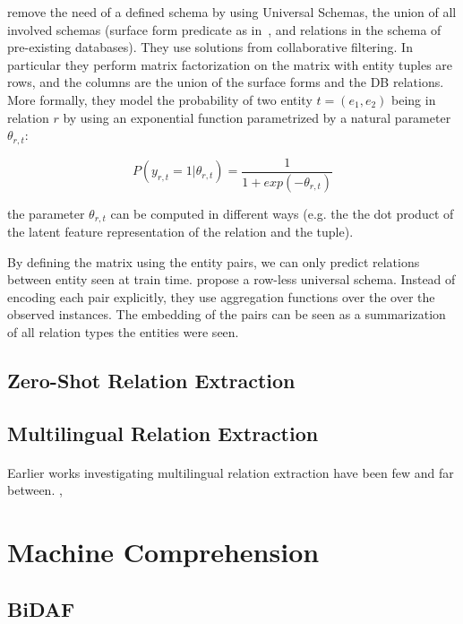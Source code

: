 \cite{riedel2013relation} remove the need of a defined schema by using Universal Schemas, the union of all involved schemas (surface form predicate as in~\citep{banko2007openre}, and relations in the schema of pre-existing databases). They use solutions from collaborative filtering. In particular they perform matrix factorization on the matrix with entity tuples are rows, and the columns are the union of the surface forms and the DB relations. More formally, they model the probability of two entity $t = (e_1, e_2)$ being in relation $r$ by using an exponential function parametrized by a natural parameter $\theta_{r, t}$:

\begin{equation}
    P(y_{r, t} = 1 | \theta_{r, t}) = \frac{1}{1+exp(-\theta_{r,t})}
\end{equation}

the parameter $\theta_{r,t}$ can be computed in different ways (e.g. the the dot product of the latent feature representation of the relation and the tuple).

By defining the matrix using the entity pairs, we can only predict relations between entity seen at train time. \cite{verga-mccallum-2016-row} propose a row-less universal schema. Instead of encoding each pair explicitly, they use aggregation functions over the over the observed instances. The embedding of the pairs can be seen as a summarization of all relation types the entities were seen.

\subsection{Zero-Shot Relation Extraction}
\cite{goldstein2018zero}

\subsection{Multilingual Relation Extraction}
\paragraph{}
Earlier works investigating multilingual relation extraction have been few and far between. \cite{faruqui2015multilingual}, \cite{verga2015multilingual}

\section{Machine Comprehension}
\label{sec:sota_mc}

\subsection{BiDAF}
